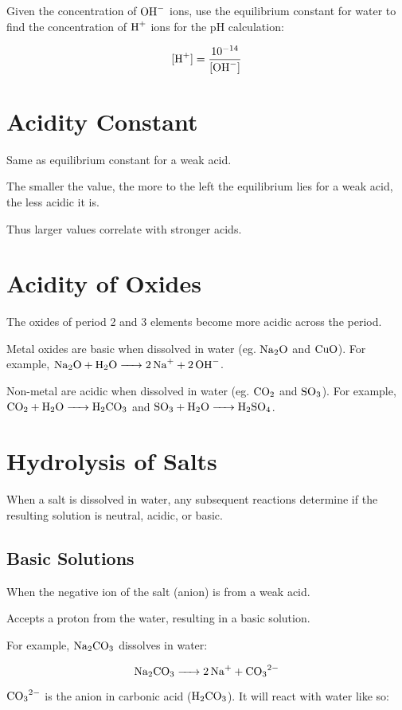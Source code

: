 \documentclass[a4paper,11pt]{article}
\begin{document}
Given the concentration of $\ce{OH-}$ ions, use the equilibrium constant for
water to find the concentration of $\ce{H+}$ ions for the pH calculation:

$$
[\ce{H+}] = \frac{10^{-14}}{[\ce{OH-}]}
$$


\section{Acidity Constant}

Same as equilibrium constant for a weak acid.

The smaller the value, the more to the left the equilibrium lies for a weak
acid, the less acidic it is.

Thus larger values correlate with stronger acids.


\section{Acidity of Oxides}

The oxides of period 2 and 3 elements become more acidic across the period.

Metal oxides are basic when dissolved in water (eg. $\ce{Na2O}$ and $\ce{CuO}$).
For example, $\ce{Na2O + H2O -> 2Na+ + 2OH-}$.

Non-metal are acidic when dissolved in water (eg. $\ce{CO2}$ and $\ce{SO3}$).
For example, $\ce{CO2 + H2O -> H2CO3}$ and $\ce{SO3 + H2O -> H2SO4}$.


\section{Hydrolysis of Salts}

When a salt is dissolved in water, any subsequent reactions determine if the
resulting solution is neutral, acidic, or basic.


\subsection{Basic Solutions}

When the negative ion of the salt (anion) is from a weak acid.

Accepts a proton from the water, resulting in a basic solution.

For example, $\ce{Na2CO3}$ dissolves in water:

$$
\ce{Na2CO3 -> 2Na+ + CO3^2-}
$$

$\ce{CO3^2-}$ is the anion in carbonic acid ($\ce{H2CO3}$). It will react with
water like so:
\end{document}
